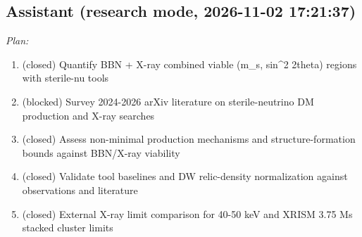 \documentclass[11pt,a4paper]{article}
\begin{document}
\subsection*{Assistant \small(research mode, 2026-11-02 17:21:37)}
\textit{Plan:}\begin{enumerate}
  \item (closed) Quantify BBN + X-ray combined viable (m\_s, sin\textasciicircum{}2 2theta) regions with sterile-nu tools
  \item (blocked) Survey 2024-2026 arXiv literature on sterile-neutrino DM production and X-ray searches
  \item (closed) Assess non-minimal production mechanisms and structure-formation bounds against BBN/X-ray viability
  \item (closed) Validate tool baselines and DW relic-density normalization against observations and literature
  \item (closed) External X-ray limit comparison for 40-50 keV and XRISM 3.75 Ms stacked cluster limits
\end{enumerate}
\end{document}
